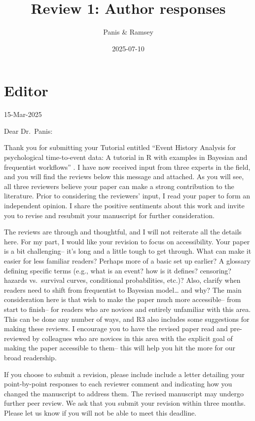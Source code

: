 \documentclass[
]{article}
\title{Review 1: Author responses}
\author{Panis \& Ramsey}
\date{2025-07-10}
\renewenvironment{quote}{\begin{leftbar}}{\end{leftbar}}
\begin{document}
\maketitle

\section{Editor}\label{editor}

\begin{quote}
15-Mar-2025

Dear Dr.~Panis:

Thank you for submitting your Tutorial entitled ``Event History Analysis
for psychological time-to-event data: A tutorial in R with examples in
Bayesian and frequentist workflows'' . I have now received input from
three experts in the field, and you will find the reviews below this
message and attached. As you will see, all three reviewers believe your
paper can make a strong contribution to the literature. Prior to
considering the reviewers' input, I read your paper to form an
independent opinion. I share the positive sentiments about this work and
invite you to revise and resubmit your manuscript for further
consideration.
\end{quote}

\begin{quote}
The reviews are through and thoughtful, and I will not reiterate all the
details here. For my part, I would like your revision to focus on
accessibility. Your paper is a bit challenging-- it's long and a little
tough to get through. What can make it easier for less familiar readers?
Perhaps more of a basic set up earlier? A glossary defining specific
terms (e.g., what is an event? how is it defines? censoring? hazards
vs.~survival curves, conditional probabilities, etc.)? Also, clarify
when readers need to shift from frequentist to Bayesian model\ldots{}
and why? The main consideration here is that wish to make the paper much
more accessible-- from start to finish-- for readers who are novices and
entirely unfamiliar with this area. This can be done any number of ways,
and R3 also includes some suggestions for making these reviews. I
encourage you to have the revised paper read and pre-reviewed by
colleagues who are novices in this area with the explicit goal of making
the paper accessible to them-- this will help you hit the more for our
broad readership.
\end{quote}

\begin{quote}
If you choose to submit a revision, please include include a letter
detailing your point-by-point responses to each reviewer comment and
indicating how you changed the manuscript to address them. The revised
manuscript may undergo further peer review. We ask that you submit your
revision within three months. Please let us know if you will not be able
to meet this deadline.
\end{quote}
\end{document}
